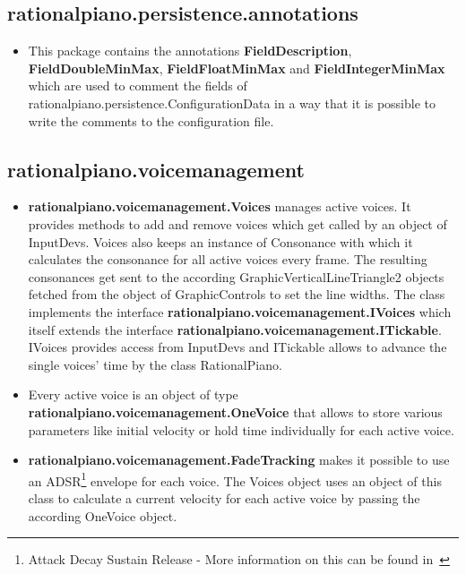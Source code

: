 \documentclass[12pt,a4paper,titlepage,oneside]{report}
\begin{document}
\subsection{rationalpiano.persistence.annotations}

\begin{itemize}
	\item This package contains the annotations \textbf{FieldDescription}, \textbf{FieldDoubleMinMax}, \textbf{FieldFloatMinMax} and \textbf{FieldIntegerMinMax} which are used to comment the fields of rationalpiano.persistence.ConfigurationData in a way that it is possible to write the comments to the configuration file.
\end{itemize}


\subsection{rationalpiano.voicemanagement}

\begin{itemize}
	\item \textbf{rationalpiano.voicemanagement.Voices} manages active voices. It provides methods to add and remove voices which get called by an object of InputDevs. Voices also keeps an instance of Consonance with which it calculates the consonance for all active voices every frame. The resulting consonances get sent to the according GraphicVerticalLineTriangle2 objects fetched from the object of GraphicControls to set the line widths. The class implements the interface \textbf{rationalpiano.voicemanagement.IVoices} which itself extends the interface \textbf{rationalpiano.voicemanagement.ITickable}. IVoices provides access from InputDevs and ITickable allows to advance the single voices' time by the class RationalPiano.

	\item Every active voice is an object of type \textbf{rationalpiano.voicemanagement.OneVoice} that allows to store various parameters like initial velocity or hold time individually for each active voice. 

	\item \textbf{rationalpiano.voicemanagement.FadeTracking} makes it possible to use an ADSR\footnote{Attack Decay Sustain Release - More information on this can be found in~\cite{bib:RationalPianoDoc}} envelope for each voice. The Voices object uses an object of this class to calculate a current velocity for each active voice by passing the according OneVoice object.
\end{itemize}
\end{document}
